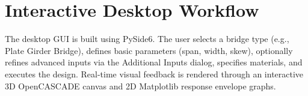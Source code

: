 \section{Interactive Desktop Workflow}
The desktop GUI is built using PySide6. The user selects a bridge type (e.g., Plate Girder Bridge), defines basic parameters (span, width, skew), optionally refines advanced inputs via the Additional Inputs dialog, specifies materials, and executes the design. Real-time visual feedback is rendered through an interactive 3D OpenCASCADE canvas and 2D Matplotlib response envelope graphs.
